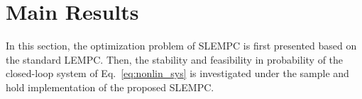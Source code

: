 \documentclass[letterpaper, 10pt, conference]{ieeeconf}
\begin{document}
	
	\section{Main Results}
	In this section, the optimization problem of SLEMPC is first presented based on the standard LEMPC. Then, the stability and feasibility in probability of the closed-loop system of Eq.~\ref{eq:nonlin_sys} is investigated under the sample and hold implementation of the proposed SLEMPC.
	
\end{document}
